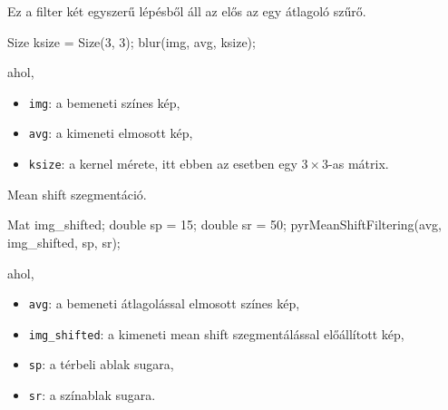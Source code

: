 
Ez a filter két egyszerű lépésből áll az elős az egy átlagoló szűrő.
\begin{cpp}
Size ksize = Size(3, 3);
blur(img, avg, ksize);
\end{cpp}
ahol,
\begin{itemize}
    \item \texttt{img}: a bemeneti színes kép,
    \item \texttt{avg}: a kimeneti elmosott kép,
    \item \texttt{ksize}: a kernel mérete, itt ebben az esetben egy $3 \times 3$-as mátrix.
\end{itemize}

Mean shift szegmentáció.
\begin{cpp}
Mat img_shifted;
double sp = 15;
double sr = 50;
pyrMeanShiftFiltering(avg, img_shifted, sp, sr);
\end{cpp}
ahol,
\begin{itemize}
    \item \texttt{avg}: a bemeneti átlagolással elmosott színes kép,
    \item \texttt{img\_shifted}: a kimeneti mean shift szegmentálással előállított kép,
    \item \texttt{sp}: a térbeli ablak sugara,
    \item \texttt{sr}: a színablak sugara.
\end{itemize}



